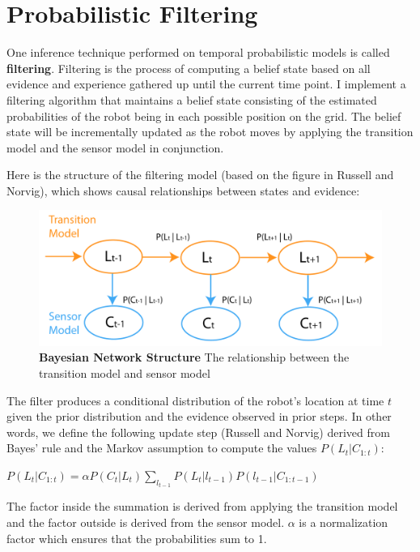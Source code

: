 \documentclass{article}
\begin{document}
\section{Probabilistic Filtering}

One inference technique performed on temporal probabilistic models is called {\bf filtering}. Filtering is the process of computing a belief state based on all evidence and experience gathered up until the current time point. I implement a filtering algorithm that maintains a belief state consisting of the estimated probabilities of the robot being in each possible position on the grid. The belief state will be incrementally updated as the robot moves by applying the transition model and the sensor model in conjunction.

Here is the structure of the filtering model (based on the figure in Russell and Norvig), which shows causal relationships between states and evidence:

\begin{figure}[!htb]
\centering
\includegraphics[scale=0.55]{bayesiannetwork.pdf}
\caption{{\bf Bayesian Network Structure} The relationship between the transition model and sensor model}
\end{figure}

The filter produces a conditional distribution of the robot's location at time $t$ given the prior distribution and the evidence observed in prior steps. In other words, we define the following update step (Russell and Norvig) derived from Bayes' rule and the Markov assumption to compute the values $P(L_t | C_{1:t})$:

\vspace{5mm}

$P(L_t | C_{1:t}) = \alpha P(C_t | L_t) \sum_{l_{t-1}} P(L_t | l_{t-1})P(l_{t-1} | C_{1:t-1})$ 

\vspace{5mm}

The factor inside the summation is derived from applying the transition model and the factor outside is derived from the sensor model. $\alpha$ is a normalization factor which ensures that the probabilities sum to 1.
\end{document}

